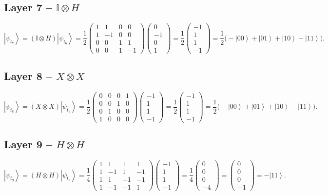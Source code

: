 \documentclass[11pt,a4paper]{article}
\newcommand{\ket}[1]{\left|#1\right\rangle}
\newcommand{\psit}[1]{\ket{\psi_{t_{#1}}}}
\newcommand{\HH}{\begin{pmatrix} 1 & 1 & 1 & 1\\ 1 & -1 & 1 & -1\\ 1 & 1 & -1 & -1\\ 1 & -1 & -1 & 1 \end{pmatrix}}
\newcommand{\IH}{\begin{pmatrix} 1 & 1 & 0 & 0\\ 1 & -1 & 0 & 0\\ 0 & 0 & 1 & 1\\ 0 & 0 & 1 & -1 \end{pmatrix}}
\newcommand{\XX}{\begin{pmatrix} 0 & 0 & 0 & 1\\ 0 & 0 & 1 & 0\\ 0 & 1 & 0 & 0\\ 1 & 0 & 0 & 0 \end{pmatrix}}
\begin{document}
\subsection*{Layer 7 -- $\mathbb{I}\otimes H$}
\[
\psit{7} = (\mathbb{I}\otimes H)\psit{6} = \frac12\IH\begin{pmatrix}0\\-1\\0\\1\end{pmatrix}
= \frac12\begin{pmatrix}-1\\1\\1\\-1\end{pmatrix}
= \frac12\big(-\ket{00}+\ket{01}+\ket{10}-\ket{11}\big).
\]

\subsection*{Layer 8 -- $X\otimes X$}
\[
\psit{8} = (X\otimes X)\psit{7} = \frac12\XX\begin{pmatrix}-1\\1\\1\\-1\end{pmatrix}
= \frac12\begin{pmatrix}-1\\1\\1\\-1\end{pmatrix}
= \frac12\big(-\ket{00}+\ket{01}+\ket{10}-\ket{11}\big).
\]

\subsection*{Layer 9 -- $H\otimes H$}
\[
\psit{9} = (H\otimes H)\psit{8} = \frac14\HH\begin{pmatrix}-1\\1\\1\\-1\end{pmatrix}
= \frac14\begin{pmatrix}0\\0\\0\\-4\end{pmatrix}
= \begin{pmatrix}0\\0\\0\\-1\end{pmatrix} = -\ket{11}.
\]
\end{document}
